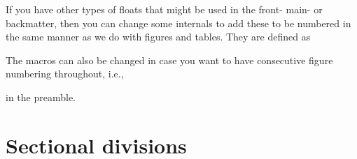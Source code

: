 If you have other types of floats that might be used in the front-
main- or backmatter, then you can change some internals to add these
to be numbered in the same manner as we do with figures and
tables. They are defined as
\begin{lcode}
\newcommand\@memfront@floats{%
  \counterwithout{figure}{chapter}
  \counterwithout{table}{chapter}}
\newcommand\@memmain@floats{%
   \counterwithin{figure}{chapter}
   \counterwithin{table}{chapter}}
\newcommand\@memback@floats{%
    \counterwithout{figure}{chapter}
    \counterwithout{table}{chapter}
    \setcounter{figure}{0}
    \setcounter{table}{0}}
\end{lcode}
%
The macros can also be changed in case you want to have consecutive
figure numbering throughout, i.e.,
\begin{lcode}
\makeatletter
{}
\renewcommand\@memfront@floats{}
\renewcommand\@memmain@floats{}
\newcommand\@memback@floats{}
\makeatother
\end{lcode}
in the preamble.




\section{Sectional divisions}

